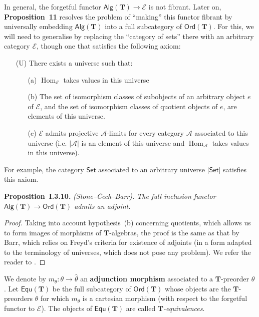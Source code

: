 \documentclass[fleqn]{article}
\newenvironment{itenv}[1]
  {\phantomsection\par\medskip\noindent\textbf{#1.}\itshape}
  {\par\medskip}
\newcommand{\oldpage}[1]{\marginpar{\footnotesize$\Big\vert$ \textit{p.~#1}}}
\newcommand{\unsure}[1]{{\color{purple}\textbf{#1}}}
\newcommand{\TT}{\mathbf{T}}
\newcommand{\cat}[1]{\mathcal{#1}}
\newcommand{\Cat}[1]{\mathsf{#1}}
\newcommand{\set}[1]{|#1|}
\newcommand{\Alg}[1]{\Cat{Alg}(#1)}
\newcommand{\Ord}[1]{\Cat{Ord}(#1)}
\newcommand{\Equ}[1]{\Cat{Equ}(#1)}
\DeclareMathOperator{\Hom}{Hom}
\begin{document}
In general, the forgetful functor $\Alg{\TT}\to\cat{E}$ is not fibrant.
Later on, \unsure{Proposition~11} resolves the problem of ``making'' this functor fibrant by universally embedding $\Alg{\TT}$ into a full subcategory of $\Ord{\TT}$.
For this, we will need to generalise \cite[Proposition~2.4]{Ba} by replacing the ``category of sets'' there with an arbitrary category $\cat{E}$, though one that satisfies the following axiom:
\begin{enumerate}
  \item[(U)] There exists a universe such that:
    \begin{enumerate}
      \item[(a)] $\Hom_\cat{E}$ takes values in this universe

      \item[(b)] The set of isomorphism classes of subobjects of an arbitrary object $e$ of $\cat{E}$, and the set of isomorphism classes of quotient objects of $e$, are elements of this universe.

      \item[(c)] $\cat{E}$ admits projective $\cat{A}$-limits for every category $\cat{A}$ associated to this universe (i.e. $\set{\cat{A}}$ is an element of this universe and $\Hom_\cat{A}$ takes values in this universe).
    \end{enumerate}
\end{enumerate}

\oldpage{241}
For example, the category $\Cat{Set}$ associated to an arbitrary universe $\set{\Cat{Set}}$ satisfies this axiom.

\begin{itenv}{Proposition~I.3.10}
  \emph{(Stone--Čech--Barr).}
  The full inclusion functor $\Alg{\TT}\to\Ord{\TT}$ admits an adjoint.
\end{itenv}

\begin{proof}
  Taking into account hypothesis~(b) concerning quotients, which allows us to form images of morphisms of $\TT$-algebras, the proof is the same as that by Barr, which relies on Freyd's criteria for existence of adjoints (in a form adapted to the terminology of universes, which does not pose any problem).
  We refer the reader to \cite{Ba}.
\end{proof}

We denote by $m_\theta\colon\theta\to\hat{\theta}$ an \unsure{adjunction morphism} associated to a $\TT$-preorder $\theta$.
Let $\Equ{\TT}$ be the full subcategory of $\Ord{\TT}$ whose objects are the $\TT$-preorders $\theta$ for which $m_\theta$ is a cartesian morphism (with respect to the forgetful functor to $\cat{E}$).
The objects of $\Equ{\TT}$ are called \emph{$\TT$-equivalences}.
\end{document}

